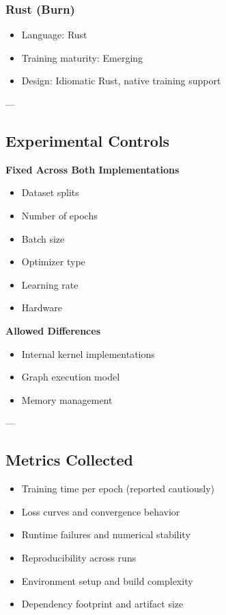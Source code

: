 \documentclass[11pt,a4paper]{article}
\begin{document}
\subsubsection{Rust (Burn)}
\begin{itemize}
    \item Language: Rust
    \item Training maturity: Emerging
    \item Design: Idiomatic Rust, native training support
\end{itemize}

---

\subsection{Experimental Controls}

\textbf{Fixed Across Both Implementations}
\begin{itemize}
    \item Dataset splits
    \item Number of epochs
    \item Batch size
    \item Optimizer type
    \item Learning rate
    \item Hardware
\end{itemize}

\textbf{Allowed Differences}
\begin{itemize}
    \item Internal kernel implementations
    \item Graph execution model
    \item Memory management
\end{itemize}

---

\subsection{Metrics Collected}

\begin{itemize}
    \item Training time per epoch (reported cautiously)
    \item Loss curves and convergence behavior
    \item Runtime failures and numerical stability
    \item Reproducibility across runs
    \item Environment setup and build complexity
    \item Dependency footprint and artifact size
\end{itemize}
\end{document}
